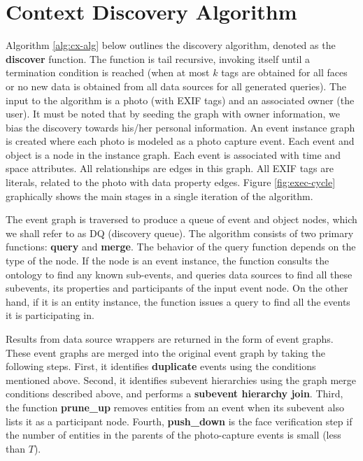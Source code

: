 \section{Context Discovery Algorithm}
\label{sec:discovery-algorithm}
Algorithm \ref{alg:cx-alg} below outlines the discovery algorithm, denoted as the \textbf{discover} function. The function is tail recursive, invoking itself until a termination condition is reached (when at most $k$ tags are obtained for all faces or no new data is obtained from all data sources for all generated queries). The input to the algorithm is a photo (with EXIF tags) and an associated owner (the user). It must be noted that by seeding the graph with owner information, we bias the discovery towards his/her personal information. An event instance graph is created where each photo is modeled as a photo capture event. Each event and object is a node in the instance graph. Each event is associated with time and space attributes. All relationships are edges in this graph. All EXIF tags are literals, related to the photo with data property edges. Figure \ref{fig:exec-cycle} graphically shows the main stages in a single iteration of the algorithm.

The event graph is traversed to produce a queue of event and object nodes, which we shall refer to as DQ (discovery queue). The algorithm consists of two primary functions: \textbf{query} and \textbf{merge}. The behavior of the query function depends on the type of the node. If the node is an event instance, the function consults the ontology to find any known sub-events, and queries data sources to find all these subevents, its properties and participants of the input event node. On the other hand, if it is an entity instance, the function issues a query to find all the events it is participating in. 

Results from data source wrappers are returned in the form of event graphs. These event graphs are merged into the original event graph by taking the following steps. First, it identifies \textbf{duplicate} events using the conditions mentioned above. Second, it identifies subevent hierarchies using the graph merge conditions described above, and performs a \textbf{subevent hierarchy join}. Third, the function \textbf{prune\_up} removes entities from an event when its subevent also lists it as a participant node. Fourth, \textbf{push\_down} is the face verification step if the number of entities in the parents of the photo-capture events is small (less than $T$). 

